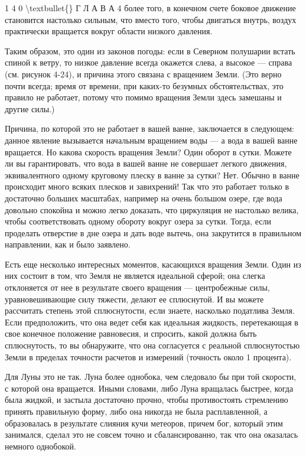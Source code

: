 \documentclass[10pt,oneside]{article}
\begin{document}
1 4 0 \textbackslash{}textbullet\{\} Г Л А В А  4 более того, в конечном счете боковое движение становится настолько сильным, что вместо того, чтобы двигаться внутрь, воздух практически вращается вокруг области низкого давления.\par

Таким образом, это один из законов погоды: если в Северном полушарии встать спиной к ветру, то низкое давление всегда окажется слева, а высокое --- справа (см. рисунок 4-24), и причина этого связана с вращением Земли. (Это верно почти всегда; время от времени, при каких-то безумных обстоятельствах, это правило не работает, потому что помимо вращения Земли здесь замешаны и другие силы.)\par

Причина, по которой это не работает в вашей ванне, заключается в следующем: данное явление вызывается начальным вращением воды --- а вода в вашей ванне вращается. Но какова скорость вращения Земли? Один оборот в сутки. Можете ли вы гарантировать, что вода в вашей ванне не совершает легкого движения, эквивалентного одному круговому плеску в ванне за сутки? Нет. Обычно в ванне происходит много всяких плесков и завихрений! Так что это работает только в достаточно больших масштабах, например на очень большом озере, где вода довольно спокойна и можно легко доказать, что циркуляция не настолько велика, чтобы соответствовать одному обороту вокруг озера за сутки. Тогда, если проделать отверстие в дне озера и дать воде вытечь, она закрутится в правильном направлении, как и было заявлено.\par

Есть еще несколько интересных моментов, касающихся вращения Земли. Один из них состоит в том, что Земля не является идеальной сферой; она слегка отклоняется от нее в результате своего вращения --- центробежные силы, уравновешивающие силу тяжести, делают ее сплюснутой. И вы можете рассчитать степень этой сплюснутости, если знаете, насколько податлива Земля. Если предположить, что она ведет себя как идеальная жидкость, перетекающая в свое конечное положение равновесия, и спросить, какой должна быть сплюснутость, то вы обнаружите, что она согласуется с реальной сплюснутостью Земли в пределах точности расчетов и измерений (точность около 1 процента).\par

Для Луны это не так. Луна более однобока, чем следовало бы при той скорости, с которой она вращается. Иными словами, либо Луна вращалась быстрее, когда была жидкой, и застыла достаточно прочно, чтобы противостоять стремлению принять правильную форму, либо она никогда не была расплавленной, а образовалась в результате слияния кучи метеоров, причем бог, который этим занимался, сделал это не совсем точно и сбалансированно, так что она оказалась немного однобокой.\par
\end{document}
